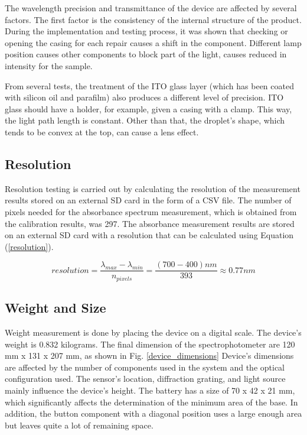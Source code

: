 \documentclass[conference]{IEEEtran}
\begin{document}
The wavelength precision and transmittance of the device are affected by several factors. 
The first factor is the consistency of the internal structure of the product.
During the implementation and testing process, it was shown that checking or opening the casing for each repair causes a shift in the component. 
Different lamp position causes other components to block part of the light, causes reduced in intensity for the sample.

From several tests, the treatment of the ITO glass layer (which has been coated with silicon oil and parafilm) also produces a different level of precision. 
ITO glass should have a holder, for example, given a casing with a clamp. 
This way, the light path length is constant. Other than that, the droplet's shape, which tends to be convex at the top, can cause a lens effect\cite{b3}.
    
\subsection{Resolution}
Resolution testing is carried out by calculating the resolution of the measurement results stored on an external SD card in the form of a CSV file.
The number of pixels needed for the absorbance spectrum measurement, which is obtained from the calibration results, was 297.
The absorbance measurement results are stored on an external SD card with a resolution that can be calculated using Equation (\ref{resolution}).

    \begin{equation}
    resolution=\frac{\lambda_{max} - \lambda_{min}}{n_{pixels}}=\frac{(700 - 400)nm}{393}\approx0.77nm
    \label{resolution}
    \end{equation}

\subsection{Weight and Size}
Weight measurement is done by placing the device on a digital scale.
The device's weight is 0.832 kilograms. 
The final dimension of the spectrophotometer are 120 mm x 131 x 207 mm, as shown in Fig. \ref{device_dimensions}
Device's dimensions are affected by the number of components used in the system and the optical configuration used. 
The sensor's location, diffraction grating, and light source mainly influence the device's height. 
The battery has a size of 70 x 42 x 21 mm, which significantly affects the determination of the minimum area of the base.
In addition, the button component with a diagonal position uses a large enough area but leaves quite a lot of remaining space.
\end{document}
